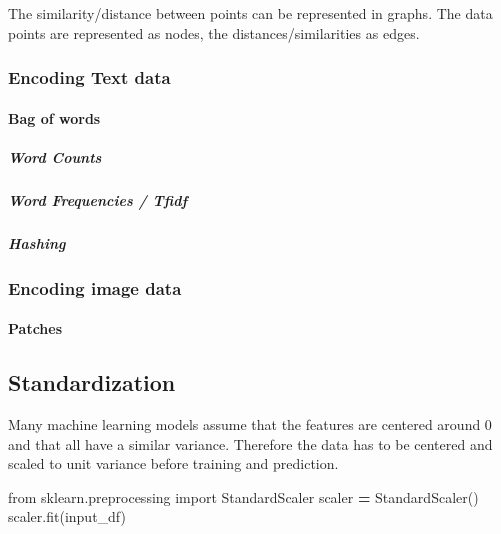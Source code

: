 \documentclass[
]{book}
\newenvironment{Shaded}{\begin{snugshade}}{\end{snugshade}}
\newcommand{\ImportTok}[1]{#1}
\newcommand{\NormalTok}[1]{#1}
\newcommand{\OperatorTok}[1]{\textcolor[rgb]{0.81,0.36,0.00}{\textbf{#1}}}
\begin{document}
The similarity/distance between points can be represented in graphs. The
data points are represented as nodes, the distances/similarities as
edges.

\hypertarget{encoding-text-data}{%
\subsubsection{Encoding Text data}\label{encoding-text-data}}

\hypertarget{bag-of-words}{%
\paragraph{Bag of words}\label{bag-of-words}}

\hypertarget{word-counts}{%
\subparagraph{Word Counts}\label{word-counts}}

\hypertarget{word-frequencies-tfidf}{%
\subparagraph{Word Frequencies / Tfidf}\label{word-frequencies-tfidf}}

\hypertarget{hashing}{%
\subparagraph{Hashing}\label{hashing}}

\hypertarget{encoding-image-data}{%
\subsubsection{Encoding image data}\label{encoding-image-data}}

\hypertarget{patches}{%
\paragraph{Patches}\label{patches}}

\hypertarget{standardization}{%
\subsection{Standardization}\label{standardization}}

Many machine learning models assume that the features are centered
around 0 and that all have a similar variance. Therefore the data has to
be centered and scaled to unit variance before training and prediction.

\begin{Shaded}
\begin{Highlighting}[]
\ImportTok{from}\NormalTok{ sklearn.preprocessing }\ImportTok{import}\NormalTok{ StandardScaler}
\NormalTok{scaler }\OperatorTok{=}\NormalTok{ StandardScaler()}
\NormalTok{scaler.fit(input\_df)}
\end{Highlighting}
\end{Shaded}
\end{document}
